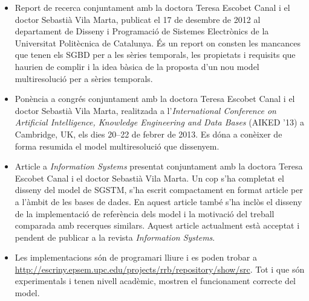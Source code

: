 \begin{itemize}

\item Report de recerca \parencite{llusa12:report} conjuntament amb la
  doctora Teresa Escobet Canal i el doctor Sebastià Vila Marta,
  publicat el 17 de desembre de 2012 al departament de Disseny i
  Programació de Sistemes Electrònics de la Universitat Politècnica de
  Catalunya. És un report on consten les mancances que tenen els
  \gls{SGBD} per a les sèries temporals, les propietats i requisits
  que haurien de complir i la idea bàsica de la proposta d'un nou
  model multiresolució per a sèries temporals.

\item Ponència a congrés \parencite{llusa13:aiked} conjuntament amb la
  doctora Teresa Escobet Canal i el doctor Sebastià Vila Marta, realitzada
  a l'\emph{International Conference on Artificial Intelligence, Knowledge
  Engineering and Data Bases} (AIKED '13) a Cambridge, UK, els dies
  20--22 de febrer de 2013.  Es dóna a conèixer de forma resumida el
  model multiresolució que dissenyem.


\item Article a \emph{Information Systems} \parencite{llusa15:is}
  presentat conjuntament amb la doctora Teresa Escobet Canal i el
  doctor Sebastià Vila Marta. Un cop s'ha completat el disseny del
  model de \gls{SGSTM}, s'ha escrit compactament en format article per
  a l'àmbit de les bases de dades.  En aquest article també s'ha
  inclòs el disseny de la implementació de referència dels model i la
  motivació del treball comparada amb recerques similars.  Aquest
  article actualment està acceptat i pendent de publicar a la revista
  \emph{Information Systems}.

\item Les implementacions són de programari lliure i es poden trobar a
  \url{http://escriny.epsem.upc.edu/projects/rrb/repository/show/src}. Tot
  i que són experimentals i tenen nivell acadèmic, mostren el
  funcionament correcte del model.

\end{itemize}






